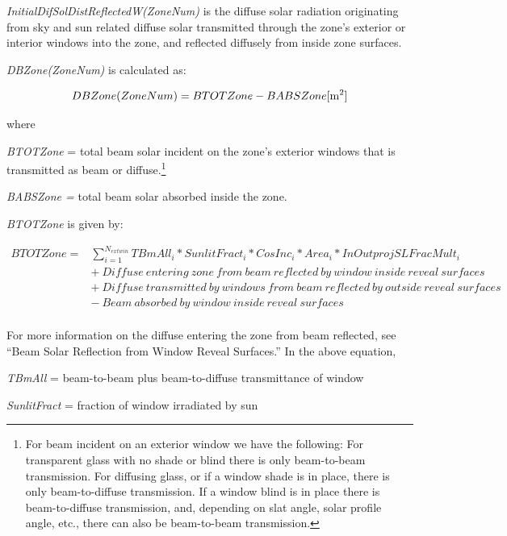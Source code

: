 \emph{InitialDifSolDistReflectedW(ZoneNum)} is the diffuse solar radiation originating from sky and sun related diffuse solar transmitted through the zone's exterior or interior windows into the zone, and reflected diffusely from inside zone surfaces.

\emph{DBZone(ZoneNum)} is calculated as:

\begin{equation}
DBZone(ZoneNum) = BTOTZone - BABSZone{\rm{    [}}{{\rm{m}}^{\rm{2}}}]
\end{equation}

where

\emph{BTOTZone} = total beam solar incident on the zone's exterior windows that is transmitted as beam or diffuse.\footnote{For beam incident on an exterior window we have the following: For transparent glass with no shade or blind there is only beam-to-beam transmission. For diffusing glass, or if a window shade is in place, there is only beam-to-diffuse transmission. If a window blind is in place there is beam-to-diffuse transmission, and, depending on slat angle, solar profile angle, etc., there can also be beam-to-beam transmission.}

\emph{BABSZone =} total beam solar absorbed inside the zone.

\emph{BTOTZone} is given by:

\begin{equation}
\begin{array}{rl}
BTOTZone = & \sum\limits_{i = 1}^{{N_{extwin}}} {TBmAl{l_i}*SunlitFrac{t_i}*CosIn{c_i}*Are{a_i}*InOutprojSLFracMul{t_i}} \\
           & +~Diffuse~entering~zone~from~beam~reflected~by~window~inside~reveal~surfaces \\
           & +~Diffuse~transmitted~by~windows~from~beam~reflected~by~outside~reveal~surfaces \\
           & -~Beam~absorbed~by~window~inside~reveal~surfaces \\
\end{array}
\end{equation}

For more information on the diffuse entering the zone from beam reflected, see ``Beam Solar Reflection from Window Reveal Surfaces.''  In the above equation,

\emph{TBmAll} = beam-to-beam plus beam-to-diffuse transmittance of window

\emph{SunlitFract} = fraction of window irradiated by sun

